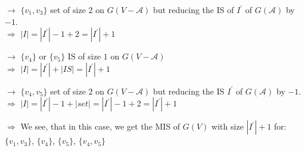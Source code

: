 \documentclass{article}
\newtheorem*{theorem A}{Theorem A}
\newtheorem*{theorem B}{N\"olker's Theorem}
\theoremstyle{remark}
\theoremstyle{remark}
\begin{document}
\begin{enumerate}
    \vspace{0.3cm}
    $\rightarrow$ $\{ v_{1}, v_{3} \}$ set of size $2$ on $G\left(V - \mathcal{A}\right)$ but reducing the IS of $I^{\prime}$ of $G\left(\mathcal{A}\right)$ by $-1$.\\
        $\Rightarrow$ $|I| = |I^{\prime}| - 1 + 2 = |I^{\prime}| + 1$

    \vspace{0.3cm}
    $\rightarrow$ $\{ v_{4} \}$ or $\{ v_{5} \}$ IS of size $1$ on $G\left(V - \mathcal{A}\right)$\\
        $\Rightarrow$ $|I| = |I^{\prime}| + |IS| = |I^{\prime}| + 1$

    \vspace{0.3cm}
    $\rightarrow$ $\{ v_{4}, v_{5} \}$ set of size $2$ on $G\left(V - \mathcal{A}\right)$ but reducing the IS $I^{\prime}$ of $G\left(\mathcal{A}\right)$ by $-1$.\\
        $\Rightarrow$ $|I| = |I^{\prime}| - 1 + |set| = |I^{\prime}| - 1 + 2 = |I^{\prime}| + 1$

    \vspace{0.3cm}
    $\Rightarrow$ We see, that in this case, we get the MIS of $G\left(V\right)$ with size $|I^{\prime}| + 1$ for: $\{ v_{1}, v_{3} \}$, $\{ v_{4} \}$, $\{ v_{5} \}$, $\{ v_{4}, v_{5} \}$

\label{enum:independentsetdiscussion}
\end{enumerate}
\end{document}
